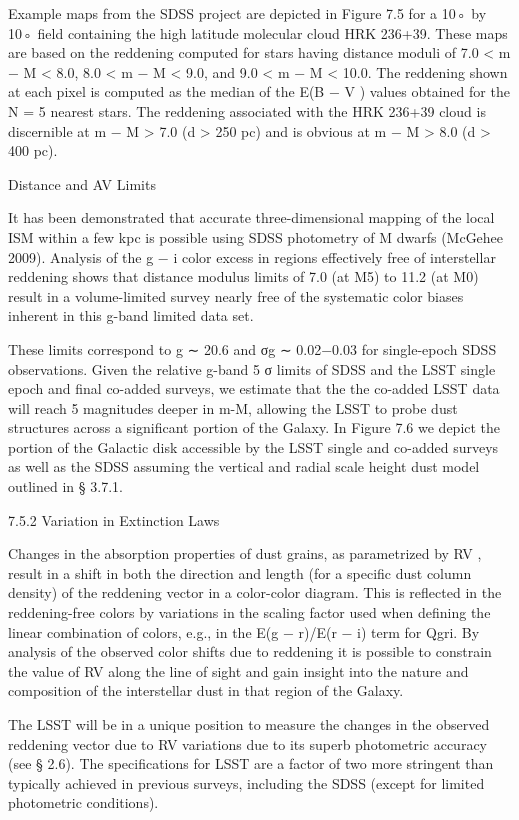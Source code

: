 Example maps from the SDSS project are depicted in Figure 7.5 for a 10◦ by 10◦ field containing the
high latitude molecular cloud HRK 236+39. These maps are based on the reddening computed for
stars having distance moduli of 7.0 < m − M < 8.0, 8.0 < m − M < 9.0, and 9.0 < m − M < 10.0.
The reddening shown at each pixel is computed as the median of the E(B − V ) values obtained
for the N = 5 nearest stars. The reddening associated with the HRK 236+39 cloud is discernible
at m − M > 7.0 (d > 250 pc) and is obvious at m − M > 8.0 (d > 400 pc).

Distance and AV Limits

It has been demonstrated that accurate three-dimensional mapping of the local ISM within a few
kpc is possible using SDSS photometry of M dwarfs (McGehee 2009). Analysis of the g − i color
excess in regions effectively free of interstellar reddening shows that distance modulus limits of 7.0
(at M5) to 11.2 (at M0) result in a volume-limited survey nearly free of the systematic color biases
inherent in this g-band limited data set.

These limits correspond to g ∼ 20.6 and σg ∼ 0.02−0.03 for single-epoch SDSS observations. Given
the relative g-band 5 σ limits of SDSS and the LSST single epoch and final co-added surveys, we
estimate that the the co-added LSST data will reach 5 magnitudes deeper in m-M, allowing the
LSST to probe dust structures across a significant portion of the Galaxy. In Figure 7.6 we depict
the portion of the Galactic disk accessible by the LSST single and co-added surveys as well as the
SDSS assuming the vertical and radial scale height dust model outlined in § 3.7.1.

7.5.2 Variation in Extinction Laws

Changes in the absorption properties of dust grains, as parametrized by RV , result in a shift in
both the direction and length (for a specific dust column density) of the reddening vector in a
color-color diagram. This is reflected in the reddening-free colors by variations in the scaling factor
used when defining the linear combination of colors, e.g., in the E(g − r)/E(r − i) term for Qgri.
By analysis of the observed color shifts due to reddening it is possible to constrain the value of RV
along the line of sight and gain insight into the nature and composition of the interstellar dust in
that region of the Galaxy.

The LSST will be in a unique position to measure the changes in the observed reddening vector
due to RV variations due to its superb photometric accuracy (see § 2.6). The specifications for
LSST are a factor of two more stringent than typically achieved in previous surveys, including the
SDSS (except for limited photometric conditions).

